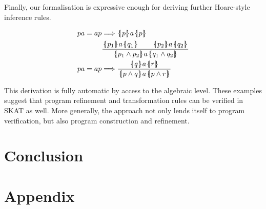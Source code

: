 \documentclass{llncs}
\newcommand{\llbrace}{\hspace{1pt} \lbrace \kern -3pt \vert \hspace{1pt}}
\newcommand{\rrbrace}{\hspace{0.5pt} \rbrace \kern -5pt \vert \hspace{3pt}}
\newcommand{\triple}[3]{\llbrace #1 \rrbrace #2 \llbrace #3 \rrbrace}
\begin{document}
Finally, our formalisation is expressive enough for deriving further
Hoare-style inference rules.

\begin{align*}
pa = ap &\Longrightarrow \triple{p}{a}{p}\\
&\frac{\triple{p_1}{a}{q_1} \qquad \triple{p_2}{a}{q_2}}{\triple{p_1 \wedge p_2}{a}{q_1 \wedge q_2}}\\
pa = ap &\Longrightarrow \frac{\triple{q}{a}{r}}{\triple{p \wedge q}{a}{p \wedge r}}
\end{align*}

This derivation is fully automatic by access to the algebraic
level. These examples suggest that program refinement and
transformation rules can be verified in SKAT as well. More generally,
the approach not only lends itself to program verification, but also
program construction and refinement.

\section{Conclusion}




\newpage
\appendix
\section{Appendix}
\end{document}
